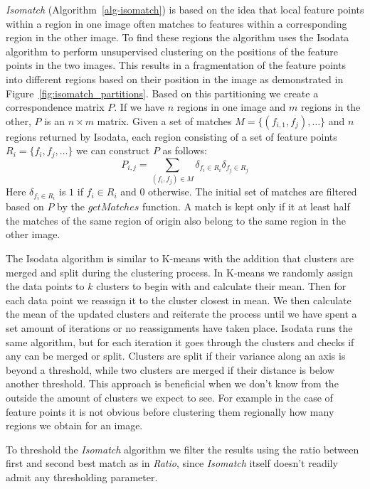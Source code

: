 \emph{Isomatch} (Algorithm~\ref{alg-isomatch}) \cite{das2008event} is 
based on the idea that local feature points within a region in one image 
often matches to features within a corresponding region in the other 
image. To find these regions the algorithm uses the Isodata algorithm 
\cite{ball1965isodata} to perform unsupervised clustering on the 
positions of the feature points in the two images. This results in a 
fragmentation of the feature points into different regions based on 
their position in the image as demonstrated in 
Figure~\ref{fig:isomatch_partitions}. Based on this partitioning we 
create a correspondence matrix $P$. If we have $n$ regions in one image 
and $m$ regions in the other, $P$ is an $n \times m$ matrix. Given a set 
of matches $M = \{(f_{i,1}, f_{j}), \ldots \}$ and $n$ regions returned 
by Isodata, each region consisting of a set of feature points $R_i = 
\{f_i, f_j, \ldots\}$ we can construct $P$ as follows:
\begin{equation*}
    P_{i,j} = \sum_{(f_i,f_j) \in M} \delta_{f_i \in R_i}\delta_{f_j \in 
    R_j}
\end{equation*}
Here $\delta_{f_i \in R_i}$ is $1$ if $f_i \in R_i$ and $0$ otherwise.  
The initial set of matches are filtered based on $P$ by the $getMatches$ 
function. A match is kept only if it at least half the matches of the 
same region of origin also belong to the same region in the other image.  

The Isodata algorithm is similar to K-means with the addition that 
clusters are merged and split during the clustering process. In K-means 
we randomly assign the data points to $k$ clusters to begin with and 
calculate their mean. Then for each data point we reassign it to the 
cluster closest in mean. We then calculate the mean of the updated 
clusters and reiterate the process until we have spent a set amount of 
iterations or no reassignments have taken place. Isodata runs the same 
algorithm, but for each iteration it goes through the clusters and 
checks if any can be merged or split. Clusters are split if their 
variance along an axis is beyond a threshold, while two clusters are 
merged if their distance is below another threshold. This approach is 
beneficial when we don't know from the outside the amount of clusters we 
expect to see. For example in the case of feature points it is not 
obvious before clustering them regionally how many regions we obtain for 
an image.

To threshold the \emph{Isomatch} algorithm we filter the results using 
the ratio between first and second best match as in \emph{Ratio}, since 
\emph{Isomatch} itself doesn't readily admit any thresholding parameter.  

